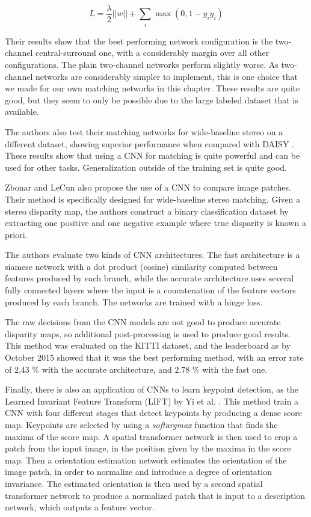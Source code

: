 \begin{equation}
	L = \frac{\lambda}{2} ||w|| + \sum_i \max(0, 1 - y_i \hat{y}_i)
\end{equation}

Their results show that the best performing network configuration is the two-channel central-surround one, with a considerably margin over all other configurations. The plain two-channel networks perform slightly worse. As two-channel networks are considerably simpler to implement, this is one choice that we made for our own matching networks in this chapter. These results are quite good, but they seem to only be possible due to the large labeled dataset that is available.

The authors also test their matching networks for wide-baseline stereo on a different dataset, showing superior performance when compared with DAISY \cite{tola2008fast}. These results show that using a CNN for matching is quite powerful and can be used for other tasks. Generalization outside of the training set is quite good.

Zbonar and LeCun \cite[1em]{zbontar2016stereo} also propose the use of a CNN to compare image patches. Their method is specifically designed for wide-baseline stereo matching. Given a stereo disparity map, the authors construct a binary classification dataset by extracting one positive and one negative example where true disparity is known a priori.

The authors evaluate two kinds of CNN architectures. The fast architecture is a siamese network with a dot product (cosine) similarity computed between features produced by each branch, while the accurate architecture uses several fully connected layers where the input is a concatenation of the feature vectors produced by each branch. The networks are trained with a hinge loss.

The raw decisions from the CNN models are not good to produce accurate disparity maps, so additional post-processing is used to produce good results. This method was evaluated on the KITTI dataset, and the leaderboard as by October 2015 showed that it was the best performing method, with an error rate of $2.43$ \% with the accurate architecture, and $2.78$ \% with the fast one.

Finally, there is also an application of CNNs to learn keypoint detection, as the Learned Invariant Feature Transform (LIFT) by Yi et al. \cite[-5em]{yi2016lift}. This method train a CNN with four different stages that detect keypoints by producing a dense score map. Keypoints are selected by using a \textit{softargmax} function that finds the maxima of the score map. A spatial transformer network \cite[-3em]{jaderberg2015spatial} is then used to crop a patch from the input image, in the position given by the maxima in the score map.
Then a orientation estimation network estimates the orientation of the image patch, in order to normalize and introduce a degree of orientation invariance. The estimated orientation is then used by a second spatial transformer network to produce a normalized patch that is input to a description network, which outputs a feature vector.

